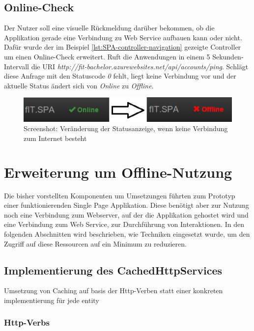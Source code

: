 \subsection{Online-Check}
\label{ssec:Online-Check}
Der Nutzer soll eine visuelle Rückmeldung darüber bekommen, ob die Applikation gerade eine Verbindung zu Web Service aufbauen kann oder nicht. Dafür wurde der im Beispiel \ref{lst:SPA-controller-navigation} gezeigte Controller um einen Online-Check erweitert. Ruft die Anwendungen in einem 5 Sekunden-Intervall die URI \textit{http://fit-bachelor.azurewebsites.net/api/accounts/ping}. Schlägt diese Anfrage mit den Statuscode \textit{0} fehlt, liegt keine Verbindung vor und der aktuelle Status ändert sich von \textit{Online} zu \textit{Offline}.
\begin{figure}[h]
\centering
\includegraphics[width=0.8\linewidth]{content/images/SPA-Online-Check}
\caption{Screenshot: Veränderung der Statusanzeige, wenn keine Verbindung zum Internet besteht}
\label{pic:SPA:OnlineCheck:Statusänderung}
\end{figure}

\section{Erweiterung um Offline-Nutzung}
\label{sec:CachedHttpService}
Die bisher vorstellten Komponenten um Umsetzungen führten zum Prototyp einer funktionierenden Single Page Applikation. Diese benötigt aber zur Nutzung noch eine Verbindung zum Webserver, auf der die Applikation gehostet wird und eine Verbindung zum Web Service, zur Durchführung von Interaktionen. In den folgenden Abschnitten wird beschrieben, wie Techniken eingesetzt wurde, um den Zugriff auf diese Ressourcen auf ein Minimum zu reduzieren. 
\subsection{Implementierung des CachedHttpServices}
\label{ssec:Exkurs-IndexedDB}
Umsetzung von Caching auf basis der Http-Verben statt einer konkreten implementierung für jede entity

\subsubsection*{Http-Verbs}
\label{sssec:Http-Verbs}

